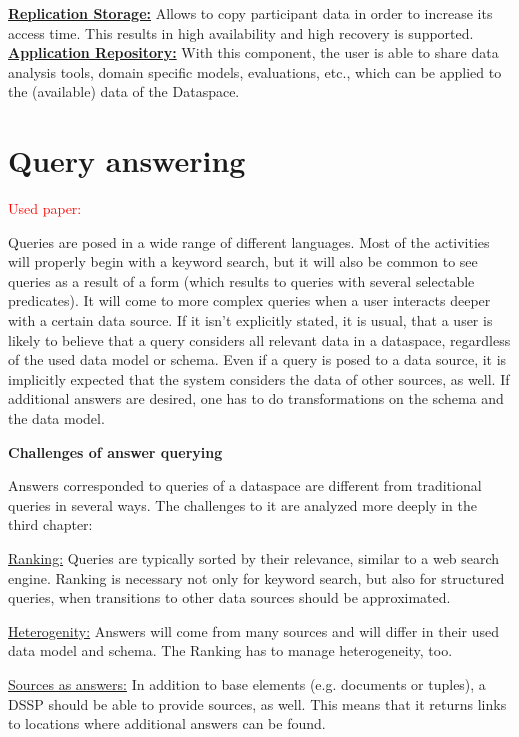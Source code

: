 \uline{\textbf{Replication Storage:}} Allows to copy participant data in order to increase its access time. This results in high availability and high recovery is supported.\\

\uline{\textbf{Application Repository:}} With this component, the user is able to share data analysis tools, domain specific models, evaluations, etc., which can be applied to the (available) data of the Dataspace.\\


\section{Query answering}
\textcolor{red}{Used paper: \cite{Halevy:2006:PDS:1142351.1142352}}

Queries are posed in a wide range of different languages. Most of the activities will properly begin with a keyword search, but it will also be common to see queries as a result of a form (which results to queries with several selectable predicates). It will come to more complex queries when a user interacts deeper with a certain data source. If it isn't explicitly stated, it is usual, that a user is likely to believe that a query considers all relevant data in a dataspace, regardless of the used data model or schema. Even if a query is posed to a data source, it is implicitly expected that the system considers the data of other sources, as well. If additional answers are desired, one has to do transformations on the schema and the data model.

\textbf{Challenges of answer querying}

Answers corresponded to queries of a dataspace are different from traditional queries in several ways. The challenges to it are analyzed more deeply in the third chapter:

\uline{Ranking:} Queries are typically sorted by their relevance, similar to a web search engine. Ranking is necessary not only for keyword search, but also for structured queries, when transitions to other data sources should be approximated.  

\uline{Heterogenity:} Answers will come from many sources and will differ in their used data model and schema. The Ranking has to manage heterogeneity, too.

\uline{Sources as answers:} In addition to base elements (e.g. documents or tuples), a DSSP should be able to provide sources, as well. This means that it returns links to locations where additional answers can be found.

